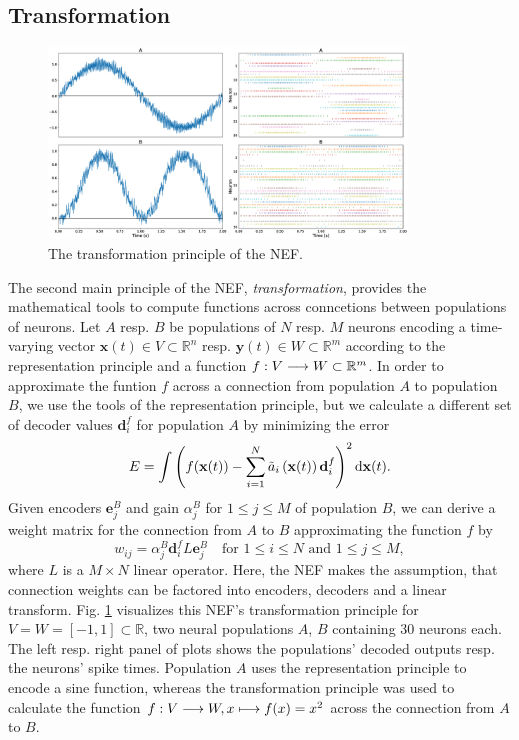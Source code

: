 \subsection{Transformation}
\begin{figure}[t]
	\centering
	\includegraphics[width=0.85\textwidth]{imgs/NEF_transformation.eps}
	\caption{The transformation principle of the \ac{NEF}.}
	\label{fig:nef_transformation}
\end{figure}
The second main principle of the \ac{NEF}, \emph{transformation}, provides the mathematical tools to compute functions across conncetions between populations of neurons.
Let $A$ resp. $B$ be populations of $N$ resp. $M$ neurons encoding a time-varying vector $\mathbf{x}(t) \in V \subset \mathbb{R}^{n}$ resp. $\mathbf{y}(t) \in W \subset \mathbb{R}^{m}$ according to the representation principle and a function $f: V \longrightarrow W \subset \mathbb{R}^{m}$.
In order to approximate the funtion $f$ across a connection from population $A$ to population $B$, we use the tools of the representation principle, but we calculate a different set of decoder values $\mathbf{d}_{i}^{f}$ for population $A$ by minimizing the error
\begin{equation}
\label{eq:nef_transformation}
E = \int \left( f(\mathbf{x}(t)) - \sum_{i=1}^{N} \tilde{a}_{i}\left(\mathbf{x}(t)\right) \mathbf{d}_{i}^{f}\right)^{2} \mathop{}\!\mathrm{d} \mathbf{x}(t).
\end{equation}
Given encoders $\mathbf{e}_{j}^{B}$ and gain $\alpha_{j}^{B}$ for $1 \leq j \leq M$ of population $B$, we can derive a weight matrix for the connection from $A$ to $B$ approximating the function $f$ by
\begin{equation}
w_{ij} = \alpha_{j}^{B} \mathbf{d}_{i}^{f} L \mathbf{e}_{j}^{B} \quad \textrm{for } 1 \leq i \leq N \textrm{ and } 1 \leq j \leq M, 
\end{equation}
where $L$ is a $M \times N$ linear operator. 
Here, the \ac{NEF} makes the assumption, that connection weights can be factored into encoders, decoders and a linear transform.
Fig. \ref{fig:nef_transformation} visualizes this \ac{NEF}'s transformation principle for $V = W = \left[ -1, 1\right] \subset \mathbb{R}$, two neural populations $A$, $B$ containing $30$ neurons each.
The left resp. right panel of plots shows the populations' decoded outputs resp. the neurons' spike times.
Population $A$ uses the representation principle to encode a sine function, whereas the transformation principle was used to calculate the function $f: V \longrightarrow W, x \longmapsto f(x)=x^{2}$ across the connection from $A$ to $B$.

